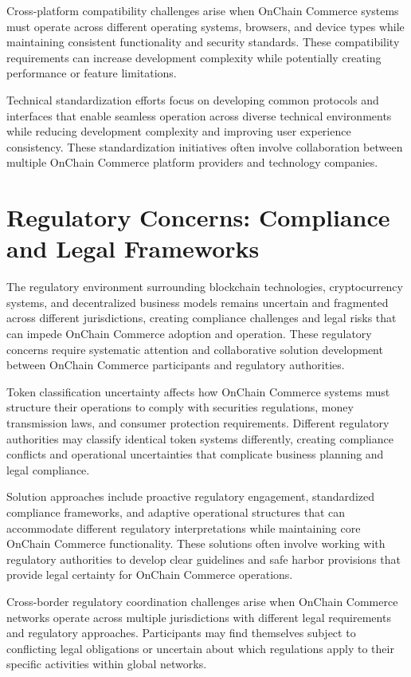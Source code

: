 \documentclass[
  Letterpaper,
]{scrbook}
\begin{document}
Cross-platform compatibility challenges arise when OnChain Commerce
systems must operate across different operating systems, browsers, and
device types while maintaining consistent functionality and security
standards. These compatibility requirements can increase development
complexity while potentially creating performance or feature
limitations.

Technical standardization efforts focus on developing common protocols
and interfaces that enable seamless operation across diverse technical
environments while reducing development complexity and improving user
experience consistency. These standardization initiatives often involve
collaboration between multiple OnChain Commerce platform providers and
technology companies.

\section{Regulatory Concerns: Compliance and Legal
Frameworks}\label{regulatory-concerns-compliance-and-legal-frameworks}

The regulatory environment surrounding blockchain technologies,
cryptocurrency systems, and decentralized business models remains
uncertain and fragmented across different jurisdictions, creating
compliance challenges and legal risks that can impede OnChain Commerce
adoption and operation. These regulatory concerns require systematic
attention and collaborative solution development between OnChain
Commerce participants and regulatory authorities.

Token classification uncertainty affects how OnChain Commerce systems
must structure their operations to comply with securities regulations,
money transmission laws, and consumer protection requirements. Different
regulatory authorities may classify identical token systems differently,
creating compliance conflicts and operational uncertainties that
complicate business planning and legal compliance.

Solution approaches include proactive regulatory engagement,
standardized compliance frameworks, and adaptive operational structures
that can accommodate different regulatory interpretations while
maintaining core OnChain Commerce functionality. These solutions often
involve working with regulatory authorities to develop clear guidelines
and safe harbor provisions that provide legal certainty for OnChain
Commerce operations.

Cross-border regulatory coordination challenges arise when OnChain
Commerce networks operate across multiple jurisdictions with different
legal requirements and regulatory approaches. Participants may find
themselves subject to conflicting legal obligations or uncertain about
which regulations apply to their specific activities within global
networks.
\end{document}
